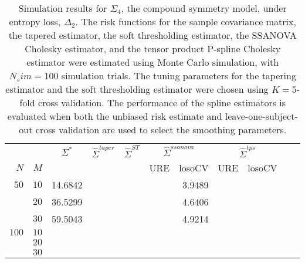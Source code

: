 \documentclass[12pt]{article}
\newcommand{\ra}[1]{\renewcommand{\arraystretch}{#1}}
\theoremstyle{definition}
\begin{document}
\begin{table}\centering
\ra{1.3}
\caption{Simulation results for $\Sigma_4$, the compound symmetry model,  under entropy loss, $\Delta_2$. The risk functions for the sample covariance matrix, the tapered estimator, the soft thresholding estimator, the SSANOVA Cholesky estimator, and the tensor product P-spline Cholesky estimator were estimated using Monte Carlo simulation, with $N_sim = 100$ simulation trials. The tuning parameters for the tapering estimator and the soft thresholding estimator were chosen using $K = 5$-fold cross validation. The performance of the spline estimators is evaluated when both the unbiased risk estimate and leave-one-subject-out cross validation are used to select the smoothing parameters.}
\begin{tabular}{@{}rrrcrcrrcrr@{}}\toprule
   &            & \multicolumn{1}{c}{$\Sigma^*$}  & \multicolumn{1}{c}{$\hat{\Sigma}^{taper}$} &\multicolumn{1}{c}{$\hat{\Sigma}^{ST}$} &\multicolumn{2}{c}{ $\hat{\Sigma}^{ssanova}$} &  \multicolumn{2}{c}{ $\hat{\Sigma}^{tps}$}\\
$N$ & $M$ 	&	  &	& & \multicolumn{1}{c}{\mbox{URE}} & \multicolumn{1}{c}{\mbox{losoCV}} &\multicolumn{1}{c}{\mbox{URE}} & \multicolumn{1}{c}{\mbox{losoCV}}\\ \midrule
$50$ & $10$ &	14.6842  &&&&	3.9489	&&\\
  & $20$  &    36.5299	&&&&  4.6406	&&\\
  & $30$   &    59.5043	&&&&  4.9214	&&\\
$100$ & $10$ &&&&&&&\\
& $20$  &&&&&&& \\
& $30$  &&&&&&& \\
\bottomrule
\end{tabular}
\end{table}
\end{document}
